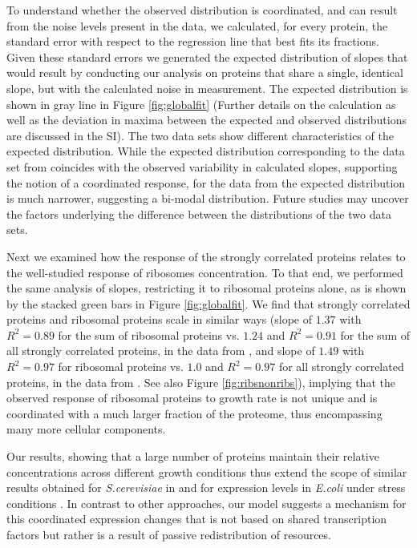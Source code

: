 \documentclass{article}
\newcommand{\hGlobalSumSlope}{$1.24$}
\newcommand{\hGlobalSumRsq}{0.91}
\newcommand{\hRibsSumSlope}{$1.37$}
\newcommand{\hRibsSumRsq}{0.89}
\newcommand{\vnGlobalSumSlope}{$1.0$}
\newcommand{\vGlobalSumSlope}{\vnGlobalSumSlope{}}
\newcommand{\vnGlobalSumRsq}{0.97}
\newcommand{\vGlobalSumRsq}{\vnGlobalSumRsq{}}
\newcommand{\vnRibsSumSlope}{$1.49$}
\newcommand{\vRibsSumSlope}{\vnRibsSumSlope{}}
\newcommand{\vnRibsSumRsq}{0.97}
\newcommand{\vRibsSumRsq}{\vnRibsSumRsq{}}
\begin{document}
To understand whether the observed distribution is coordinated, and can result from the noise levels present in the data, we calculated, for every protein, the standard error with respect to the regression line that best fits its fractions.
Given these standard errors we generated the expected distribution of slopes that would result by conducting our analysis on proteins that share a single, identical slope, but with the calculated noise in measurement.
The expected distribution is shown in gray line in Figure \ref{fig:globalfit} (Further details on the calculation as well as the deviation in maxima between the expected and observed distributions are discussed in the SI).
The two data sets show different characteristics of the expected distribution.
While the expected distribution corresponding to the data set from \cite{Heinemann2015} coincides with the observed variability in calculated slopes, supporting the notion of a coordinated response, for the data from \cite{Peebo_2015} the expected distribution is much narrower, suggesting a bi-modal distribution.
Future studies may uncover the factors underlying the difference between the distributions of the two data sets.

Next we examined how the response of the strongly correlated proteins relates to the well-studied response of ribosomes concentration.
To that end, we performed the same analysis of slopes, restricting it to ribosomal proteins alone, as is shown by the stacked green bars in Figure \ref{fig:globalfit}.
We find that strongly correlated proteins and ribosomal proteins scale in similar ways (slope of \hRibsSumSlope{} with $R^2=\hRibsSumRsq{}$ for the sum of ribosomal proteins vs. \hGlobalSumSlope{} and $R^2=\hGlobalSumRsq$ for the sum of all strongly correlated proteins, in the data from \cite{Heinemann2015}, and slope of \vRibsSumSlope{} with $R^2=\vRibsSumRsq{}$ for ribosomal proteins vs. \vGlobalSumSlope{} and $R^2=\vGlobalSumRsq{}$ for all strongly correlated proteins, in the data from \cite{Peebo_2015}. See also Figure \ref{fig:ribsnonribs}), implying that the observed response of ribosomal proteins to growth rate is not unique and is coordinated with a much larger fraction of the proteome, thus encompassing many more cellular components.

Our results, showing that a large number of proteins maintain their relative concentrations across different growth conditions thus extend the scope of similar results obtained for \emph{S.cerevisiae} in \cite{Keren2013a} and for expression levels in \emph{E.coli} under stress conditions \cite{Kaneko2014}.
In contrast to other approaches, our model suggests a mechanism for this coordinated expression changes that is not based on shared transcription factors but rather is a result of passive redistribution of resources.
\end{document}
